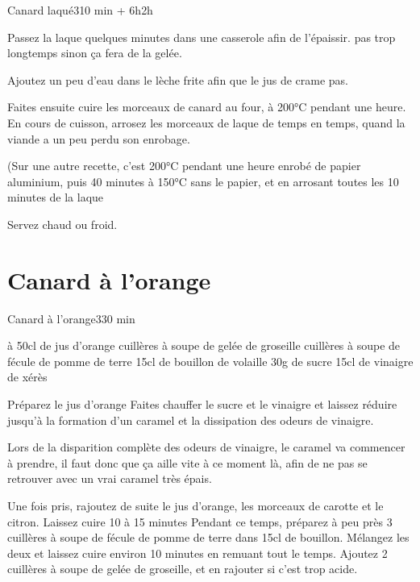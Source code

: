 {\begin{recette}{Canard laqué}{3}{10 min + 6h}{2h}
\begin{cuisson}
Passez la laque quelques minutes dans une casserole afin de l'épaissir. pas trop longtemps sinon ça fera de la gelée. 

Ajoutez un peu d'eau dans le lèche frite afin que le jus de crame pas. 

Faites ensuite cuire les morceaux de canard au four, à 200°C pendant une heure. En cours de cuisson, arrosez les morceaux de 
laque de temps en temps, quand la viande a un peu perdu son enrobage. 

(Sur une autre recette, c'est 200°C pendant une heure enrobé de papier aluminium, puis 40 minutes à 150°C sans le papier, et en arrosant toutes les 10 minutes de la laque

Servez chaud ou froid.
\end{cuisson}
\end{recette}

\section{Canard à l'orange}
\begin{recette}{Canard à l'orange}{3}{30 min}{}

\begin{ingredients}
 à 50cl de jus d'orange
 cuillères à soupe de gelée de groseille
 cuillères à soupe de fécule de pomme de terre
\ingredient 15cl de bouillon de volaille
\ingredient 30g de sucre
\ingredient 15cl de vinaigre de xérès
\end{ingredients}

\begin{preparation}
\etape Préparez le jus d'orange
\etape Faites chauffer le sucre et le vinaigre et laissez réduire jusqu'à la formation d'un caramel et la dissipation des odeurs 
de vinaigre.
\begin{attention}
Lors de la disparition complète des odeurs de vinaigre, le caramel va commencer à prendre, il faut donc que ça aille vite à ce 
moment là, afin de ne pas se retrouver avec un vrai caramel très épais. 
\end{attention}

\etape Une fois pris, rajoutez de suite le jus d'orange, les morceaux de carotte et le citron. Laissez cuire 10 à 15 minutes
\etape Pendant ce temps, préparez à peu près 3 cuillères à soupe de fécule de pomme de terre dans 15cl de bouillon.
\etape Mélangez les deux et laissez cuire environ 10 minutes en remuant tout le temps. 
\etape Ajoutez 2 cuillères à soupe de gelée de groseille, et en rajouter si c'est trop acide.
\end{preparation}
\end{recette}

}
